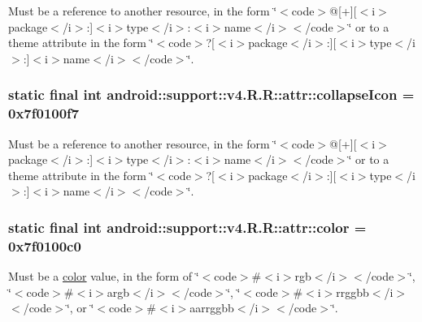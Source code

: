 Must be a reference to another resource, in the form \char`\"{}$<$code$>$@\mbox{[}+\mbox{]}\mbox{[}$<$i$>$package$<$/i$>$:\mbox{]}$<$i$>$type$<$/i$>$:$<$i$>$name$<$/i$>$$<$/code$>$\char`\"{} or to a theme attribute in the form \char`\"{}$<$code$>$?\mbox{[}$<$i$>$package$<$/i$>$:\mbox{]}\mbox{[}$<$i$>$type$<$/i$>$:\mbox{]}$<$i$>$name$<$/i$>$$<$/code$>$\char`\"{}. \hypertarget{classandroid_1_1support_1_1v4_1_1_r_1_1attr_b153dc9c13272453f558afab1a23b483}{
\subsubsection[{collapseIcon}]{\setlength{\rightskip}{0pt plus 5cm}static final int android::support::v4.R.R::attr::collapseIcon = 0x7f0100f7}}
\label{classandroid_1_1support_1_1v4_1_1_r_1_1attr_b153dc9c13272453f558afab1a23b483}


Must be a reference to another resource, in the form \char`\"{}$<$code$>$@\mbox{[}+\mbox{]}\mbox{[}$<$i$>$package$<$/i$>$:\mbox{]}$<$i$>$type$<$/i$>$:$<$i$>$name$<$/i$>$$<$/code$>$\char`\"{} or to a theme attribute in the form \char`\"{}$<$code$>$?\mbox{[}$<$i$>$package$<$/i$>$:\mbox{]}\mbox{[}$<$i$>$type$<$/i$>$:\mbox{]}$<$i$>$name$<$/i$>$$<$/code$>$\char`\"{}. \hypertarget{classandroid_1_1support_1_1v4_1_1_r_1_1attr_239b693eb28da48ef6be26d686dd3427}{
\subsubsection[{color}]{\setlength{\rightskip}{0pt plus 5cm}static final int android::support::v4.R.R::attr::color = 0x7f0100c0}}
\label{classandroid_1_1support_1_1v4_1_1_r_1_1attr_239b693eb28da48ef6be26d686dd3427}


Must be a \hyperlink{classandroid_1_1support_1_1v4_1_1_r_1_1color}{color} value, in the form of \char`\"{}$<$code$>$\#$<$i$>$rgb$<$/i$>$$<$/code$>$\char`\"{}, \char`\"{}$<$code$>$\#$<$i$>$argb$<$/i$>$$<$/code$>$\char`\"{}, \char`\"{}$<$code$>$\#$<$i$>$rrggbb$<$/i$>$$<$/code$>$\char`\"{}, or \char`\"{}$<$code$>$\#$<$i$>$aarrggbb$<$/i$>$$<$/code$>$\char`\"{}. 


